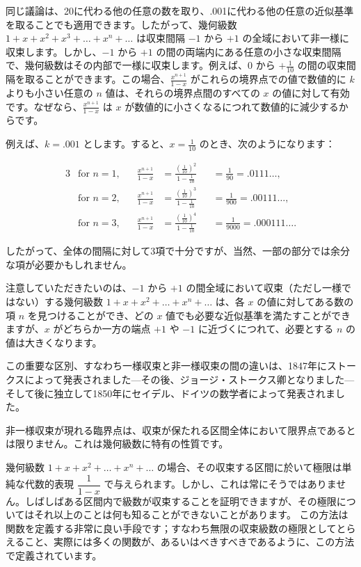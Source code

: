 \documentclass[a4paper,11pt,openany]{ltjsbook}
\begin{document}
同じ議論は、20に代わる他の任意の数を取り、.001に代わる他の任意の近似基準を取ることでも適用できます。したがって、幾何級数 $1 + x + x^2 + x^3 + \dots + x^n + \dots$ は収束間隔 $-1$ から $+1$ の全域において非一様に収束します。しかし、$-1$ から $+1$ の間の両端内にある任意の小さな収束間隔で、幾何級数はその内部で一様に収束します。例えば、$0$ から $+\frac{1}{10}$ の間の収束間隔を取ることができます。この場合、$\frac{x^{n+1}}{1 - x}$ がこれらの境界点での値で数値的に $k$ よりも小さい任意の $n$ 値は、それらの境界点間のすべての $x$ の値に対して有効です。なぜなら、$\frac{x^{n+1}}{1 - x}$ は $x$ が数値的に小さくなるにつれて数値的に減少するからです。

例えば、$k = .001$ とします。すると、$x = \frac{1}{10}$ のとき、次のようになります：

\begin{alignat*}{3}
&\text{for $n = 1$,}\quad & \frac{x^{n+1}}{1 - x}
  &= \frac{\left(\frac{1}{10}\right)^2}{1 - \frac{1}{10}}
  &&= \frac{1}{90} = .0111\dots, \\
%
&\text{for $n = 2$,}\quad & \frac{x^{n+1}}{1 - x}
  &= \frac{\left(\frac{1}{10}\right)^3}{1 - \frac{1}{10}}
  &&= \frac{1}{900} = .00111\dots, \\
%
&\text{for $n = 3$,}\quad & \frac{x^{n+1}}{1 - x}
  &= \frac{\left(\frac{1}{10}\right)^4}{1 - \frac{1}{10}}
  &&= \frac{1}{9000} = .000111\dots.
\end{alignat*}

したがって、全体の間隔に対して3項で十分ですが、当然、一部の部分では余分な項が必要かもしれません。

注意していただきたいのは、$-1$ から $+1$ の間全域において収束（ただし一様ではない）する幾何級数 $1 + x + x^2 + \dots + x^n + \dots$ は、各 $x$ の値に対してある数の項 $n$ を見つけることができ、どの $x$ 値でも必要な近似基準を満たすことができますが、$x$ がどちらか一方の端点 $+1$ や $-1$ に近づくにつれて、必要とする $n$ の値は大きくなります。

この重要な区別、すなわち一様収束と非一様収束の間の違いは、1847年にストークスによって発表されました---その後、ジョージ・ストークス卿となりました---そして後に独立して1850年にセイデル、ドイツの数学者によって発表されました。

非一様収束が現れる臨界点は、収束が保たれる区間全体において限界点であるとは限りません。これは幾何級数に特有の性質です。

幾何級数 $1 + x + x^{2} + \dots + x^{n} + \dots$ の場合、その収束する区間に於いて極限は単純な代数的表現 $\dfrac{1}{1 - x}$ で与えられます。しかし、これは常にそうではありません。しばしばある区間内で級数が収束することを証明できますが、その極限についてはそれ以上のことは何も知ることができないことがあります。
この方法は関数を定義する非常に良い手段です；すなわち無限の収束級数の極限としてとらえること、実際には多くの関数が、あるいはべきすべきであるように、この方法で定義されています。
\end{document}
